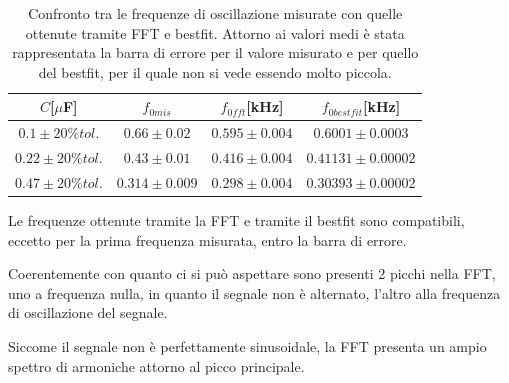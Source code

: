 \documentclass{article}
\begin{document}
        \begin{table}[H]
            \centering
            \caption{Confronto tra le frequenze di oscillazione misurate con quelle ottenute tramite FFT e bestfit.
                    Attorno ai valori medi è stata rappresentata la barra di errore per il valore
                    misurato e per quello del bestfit, per il quale non si vede essendo molto piccola.}
                \begin{tabular}{cccc}
                    $C$[$\mu$F]          &$f_{0mis}$                &   $f_{0fft}$[kHz]       & $f_{0bestfit}$[kHz] \\
                    \hline
                    $0.1 \pm 20\%tol.$   &     $0.66 \pm 0.02$      & $0.595 \pm 0.004$       & $0.6001 \pm 0.0003$ \\
                    $0.22 \pm 20\%tol.$  &$0.43 \pm 0.01$           & $0.416 \pm 0.004$       & $0.41131\pm 0.00002$ \\
                    $0.47 \pm 20\%tol.$  &$0.314 \pm 0.009 $        &$0.298 \pm 0.004$        & $0.30393\pm 0.00002$ \\
                \end{tabular}
                \label{tab:osc_smor}

        \end{table}
    
    Le frequenze ottenute tramite la FFT e tramite il bestfit sono compatibili, 
    eccetto per la prima frequenza misurata, entro la barra di errore.

    Coerentemente con quanto ci si può aspettare sono presenti 2 picchi nella FFT,
    uno a frequenza nulla, in quanto il segnale non è alternato, l'altro
    alla frequenza di oscillazione del segnale.

    Siccome il segnale non è perfettamente sinusoidale, la FFT
    presenta un ampio spettro di armoniche attorno al picco principale.
\end{document}
